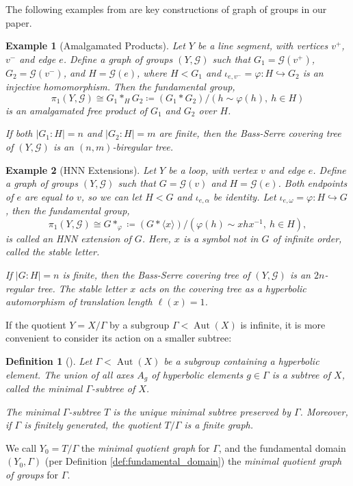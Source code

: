 \documentclass[12pt,leqno]{amsart}
\newcommand{\2}{L^2_{\rm per}(0, T)}
\newtheorem{defn}{Definition}[section]
\newtheorem{exm}{Example}[section]
\newcommand{\aut}{{\operatorname{Aut}}}
\numberwithin{equation}{section}
\numberwithin{figure}{section}
\begin{document}
The following examples from \cite{serre2002trees} are key constructions of graph of groups in our paper.
\begin{exm}[Amalgamated Products]
    Let $Y$ be a line segment, with vertices $v^+$, $v^-$ and edge $e$. Define a graph of groups $(Y,\mathcal{G})$ such that $G_1 = \mathcal{G}(v^+)$, $G_2 = \mathcal{G}(v^-)$, and $H = \mathcal{G}(e)$, where $H<G_1$ and $\iota_{e,v^-} = \varphi: H\hookrightarrow G_2$ is an injective homomorphism. Then the fundamental group,
    \[
    \pi_1(Y,\mathcal{G})\cong G_1*_{H} G_2\coloneqq (G_1*G_2)/(h\sim \varphi(h),\ h\in H)
    \]
    is an \emph{amalgamated free product} of $G_1$ and $G_2$ over $H$.

    If both $\lvert G_1: H\rvert = n$ and $\lvert G_2:H\rvert = m$ are finite, then the Bass-Serre covering tree of $(Y,\mathcal{G})$ is an $(n,m)$-biregular tree.
\end{exm}
\begin{exm}[HNN Extensions]
    Let $Y$ be a loop, with vertex $v$ and edge $e$. Define a graph of groups $(Y,\mathcal{G})$ such that $G = \mathcal{G}(v)$ and $H = \mathcal{G}(e)$. Both endpoints of $e$ are equal to $v$, so we can let $H<G$ and $\iota_{e,\alpha}$ be identity. Let $\iota_{e,\omega} = \varphi: H\hookrightarrow G$, then the fundamental group,
    \[
    \pi_1(Y,\mathcal{G})\cong G*_\varphi\coloneqq(G*\langle x\rangle)/(\varphi(h)\sim xhx^{-1},\ h\in H),
    \]
    is called an \emph{HNN extension} of $G$. Here, $x$ is a symbol not in $G$ of infinite order, called the \emph{stable letter}.
    
    If $\lvert G: H\rvert = n$ is finite, then the Bass-Serre covering tree of $(Y,\mathcal{G})$ is an $2n$-regular tree. The stable letter $x$ acts on the covering tree as a hyperbolic automorphism of translation length $\ell(x) = 1$.
\end{exm}

If the quotient $Y = X/\Gamma$ by a subgroup $\Gamma < \aut(X)$ is infinite, it is more convenient to consider its action on a smaller subtree:
\begin{defn}[\cite{dicks2006groups}]
    Let $\Gamma < \aut(X)$ be a subgroup containing a hyperbolic element. The union of all axes $A_g$ of hyperbolic elements $g \in \Gamma$ is a subtree of $X$, called the minimal $\Gamma$-subtree of $X$.
    
    The minimal $\Gamma$-subtree $T$ is the unique minimal subtree preserved by $\Gamma$. Moreover, if $\Gamma$ is finitely generated, the quotient $T/\Gamma$ is a finite graph.
\end{defn}
We call $Y_0 = T/\Gamma$ the \emph{minimal quotient graph} for $\Gamma$, and the fundamental domain $(Y_0, \Gamma)$ (per Definition \ref{def:fundamental_domain}) the \emph{minimal quotient graph of groups} for $\Gamma$.
\end{document}
